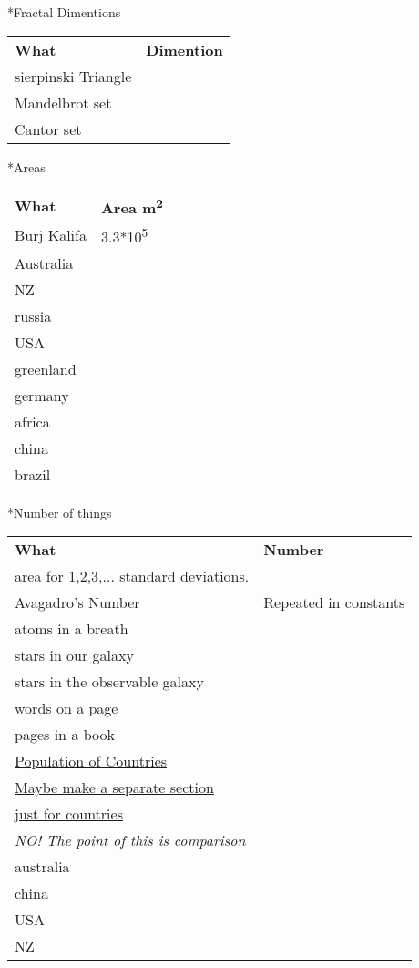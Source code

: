 \documentclass[8pt,a4paper]{extarticle}
\begin{document}
\pagebreak
\begin{section}
*{Fractal Dimentions}

\begin{tabular}{l l}
\bf{What} & \bf{Dimention}\\
sierpinski Triangle\\
Mandelbrot set\\
Cantor set\\
\end{tabular}
\end{section}

\pagebreak
\begin{section}
*{Areas}
\begin{tabular}{l l}
\bf{What} & \bf{Area m\textsuperscript{2}}\\
Burj Kalifa & 3.3*10\textsuperscript{5}\\
Australia\\
NZ\\
russia\\
USA\\
greenland\\
germany\\
africa\\
china\\
brazil\\

\end{tabular}
\end{section}



\pagebreak
\begin{section}
*{Number of things}

\begin{tabular}{l l}
\bf{What} & \bf{Number}\\

area for 1,2,3,... standard deviations.\\


Avagadro's Number & Repeated in constants\\
atoms in a breath\\
stars in our galaxy\\
stars in the observable galaxy\\
words on a page\\
pages in a book\\

\underline{Population of Countries}\\
\indent \underline{Maybe make a separate section}\\
\indent \underline{just for countries}\\
\em{NO! The point of this is comparison}\\
australia\\
china\\
USA\\
NZ\\


\end{tabular}
\end{section}
\end{document}

